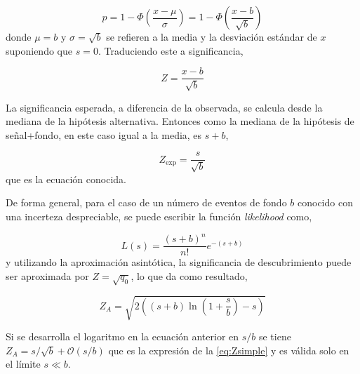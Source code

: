 \begin{equation}
  p = 1 - \Phi \left( \frac{x-\mu}{\sigma} \right) = 1 - \Phi \left(
  \frac{x-b}{\sqrt{b}} \right)
\end{equation}
%
donde $\mu=b$ y $\sigma = \sqrt{b}$ se refieren a la media y la desviación
estándar de $x$ suponiendo que $s=0$. Traduciendo este {\pvalue} a significancia,

\begin{equation}
  Z = \frac{x-b}{\sqrt{b}}
\end{equation}

La significancia esperada, a diferencia de la observada, se calcula desde la mediana
de la hipótesis alternativa. Entonces como la mediana de la hipótesis de señal+fondo,
en este caso igual a la media, es $s+b$,

\begin{equation}
  Z_\text{exp} = \frac{s}{\sqrt{b}}
  \label{eq:Zsimple}
\end{equation}
%
que es la ecuación conocida.

De forma general, para el caso de un número de eventos de fondo $b$ conocido con
una incerteza despreciable, se puede escribir la función \emph{likelihood} como,

\begin{equation}
  L(s) = \frac{(s+b)^n}{n!} e^{-(s+b)}
\end{equation}
%
y utilizando la aproximación asintótica, la significancia de descubrimiento
puede ser aproximada por $Z=\sqrt{q_0}$, lo que da como resultado,

%

\begin{equation}
  Z_A = \sqrt{2\left( (s+b) \ln \left( 1 + \frac{s}{b}\right) - s \right)}
  \label{eq:Z}
\end{equation}

Si se desarrolla el logaritmo en la ecuación anterior en $s/b$ se tiene $Z_A =
s/\sqrt{b} + \mathcal{O}(s/b)$ que es la expresión de la \cref{eq:Zsimple}
y es válida solo en el límite $s \ll b$.

